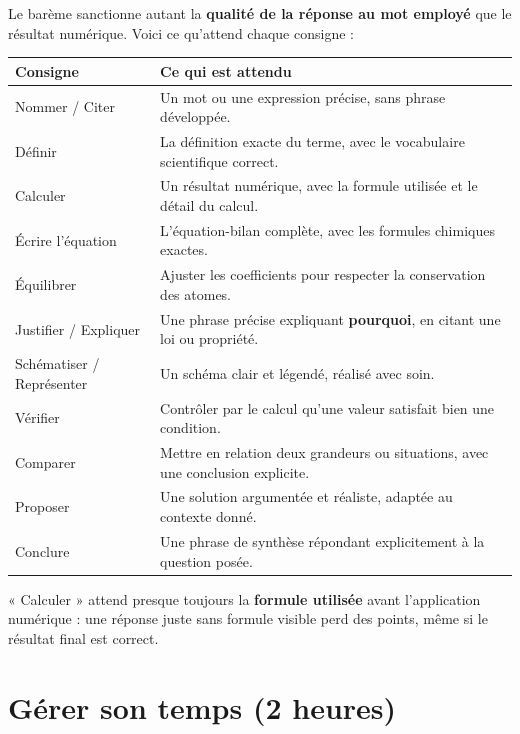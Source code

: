 \begin{propriete}
Le barème sanctionne autant la \textbf{qualité de la réponse au mot employé} que le
résultat numérique. Voici ce qu'attend chaque consigne :
\end{propriete}

\begin{center}
\small
\begin{tabular}{@{}p{3.1cm}p{9.2cm}@{}}
\toprule
\textbf{Consigne} & \textbf{Ce qui est attendu} \\
\midrule
Nommer / Citer & Un mot ou une expression précise, sans phrase développée. \\
Définir & La définition exacte du terme, avec le vocabulaire scientifique correct. \\
Calculer & Un résultat numérique, avec la formule utilisée et le détail du calcul. \\
Écrire l'équation & L'équation-bilan complète, avec les formules chimiques exactes. \\
Équilibrer & Ajuster les coefficients pour respecter la conservation des atomes. \\
Justifier / Expliquer & Une phrase précise expliquant \textbf{pourquoi}, en citant une loi ou propriété. \\
Schématiser / Représenter & Un schéma clair et légendé, réalisé avec soin. \\
Vérifier & Contrôler par le calcul qu'une valeur satisfait bien une condition. \\
Comparer & Mettre en relation deux grandeurs ou situations, avec une conclusion explicite. \\
Proposer & Une solution argumentée et réaliste, adaptée au contexte donné. \\
Conclure & Une phrase de synthèse répondant explicitement à la question posée. \\
\bottomrule
\end{tabular}
\end{center}

\begin{remarque}
« Calculer » attend presque toujours la \textbf{formule utilisée} avant l'application
numérique : une réponse juste sans formule visible perd des points, même si le résultat
final est correct.
\end{remarque}

\section{Gérer son temps (2 heures)}

